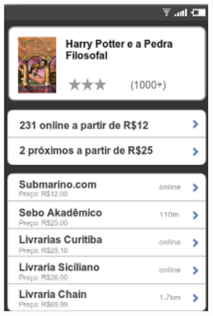 \begin{figure}[ht]
        \begin{minipage}{.5\textwidth}
            \includegraphics[scale=1]{tela/Tela}
        \end{minipage}
        \begin{minipage}{.5\textwidth}

\end{minipage}
\end{figure}
